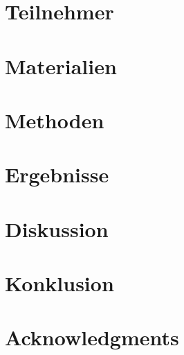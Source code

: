 \chapter{Teilnehmer}\label{chapter:kapitellabel}

\chapter{Materialien}\label{chapter:kapitellabel}

\chapter{Methoden}\label{chapter:kapitellabel}

\chapter{Ergebnisse}\label{chapter:kapitellabel}

\chapter{Diskussion}\label{chapter:kapitellabel}

\chapter{Konklusion}\label{chapter:kapitellabel}

\chapter{Acknowledgments}\label{chapter:kapitellabel}


